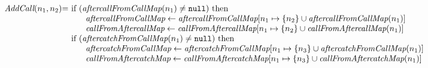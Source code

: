 \[\begin{array}{l@{}l@{~}l}
\emph{AddCall}(n_1,n_2)
	& = & \mbox{if}\ (\emph{aftercallFromCallMap}(n_1) \neq \nullK)\ \mbox{then}\\
	& & \phantom{else} \emph{aftercallFromCallMap} \leftarrow \emph{aftercallFromCallMap}[n_1 \mapsto \{n_2\}\cup \emph{aftercallFromCallMap}(n_1)]\\
	& & \phantom{else} \emph{callFromAftercallMap} \leftarrow \emph{callFromAftercallMap}[n_1 \mapsto \{n_2\}\cup \emph{callFromAftercallMap}(n_1)]\\
	&  & \mbox{if}\ (\emph{aftercatchFromCallMap}(n_1) \neq \nullK)\ \mbox{then}\\
	& & \phantom{else} \emph{aftercatchFromCallMap} \leftarrow \emph{aftercatchFromCallMap}[n_1 \mapsto \{n_3\}\cup \emph{aftercatchFromCallMap}(n_1)]\\
	& & \phantom{else} \emph{callFromAftercatchMap} \leftarrow \emph{callFromAftercatchMap}[n_1 \mapsto \{n_3\}\cup \emph{callFromAftercatchMap}(n_1)]\\
	& & \\


\end{array}
\]


